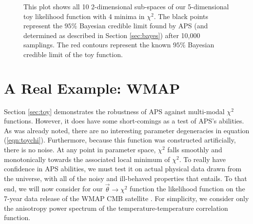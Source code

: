 \documentclass[useAMS,usenatbib]{aastex}
\begin{document}
\begin{figure*}
\caption{
This plot shows all 10 2-dimensional sub-spaces of our 5-dimensional toy likelihood
function with 4 minima in $\chi^2$.  The black points represent the $95\%$ Bayesian credible
limit found by APS (and determined as described in Section \ref{sec:bayes}) after 10,000
samplings.  The red contours represent the known $95\%$ Bayesian credible limit of the toy
function.
}
\label{fig:toyBayes4}
\end{figure*}

\section{A Real Example: WMAP}
\label{sec:wmap}

Section \ref{sec:toy} demonstrates the robustness of APS against multi-modal
$\chi^2$ functions.  However, it does have some short-comings as a test of
APS's abilities.  As was already noted, there are no interesting parameter
degeneracies in equation (\ref{eqn:toychi}).  Furthermore,
because this function was constructed artificially, there is no noise.  At
any point in parameter space, $\chi^2$ falls smoothly and monotonically towards
the associated local minimum of $\chi^2$.  To really have confidence in APS
abilities, we must test it on actual physical data drawn from the universe,
with all of the noisy and ill-behaved properties that entails.
To that end, we will now consider for our $\vec{\theta}\rightarrow\chi^2$ 
function the likelihood function on the
7-year data release of the WMAP CMB satellite \cite{wmap7,wmap7likelihood}.
For simplicity, we consider only the anisotropy
power spectrum of the temperature-temperature correlation function.
\end{document}
